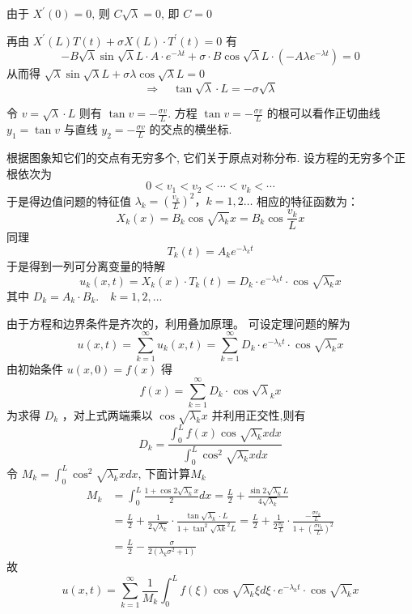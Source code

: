 \begin{questions}
\begin{solution}
由于 $ X^{\prime}(0)=0 \text {, 则 } C \sqrt{\lambda}=0 $, 即 $ C=0$

再由 $ X^{\prime}(L) T(t)+\sigma X(L) \cdot T^{\prime}(t)=0 $ 有
$$ -B \sqrt{\lambda} \sin \sqrt{\lambda} L \cdot A \cdot e^{-\lambda t}+\sigma \cdot B \cos \sqrt{\lambda} L \cdot\left(-A \lambda e^{-\lambda t}\right)=0 $$
从而得 $ \sqrt{\lambda} \sin \sqrt{\lambda} L+\sigma \lambda\cos \sqrt{\lambda} L=0 $
$$
\Rightarrow \quad \tan \sqrt{\lambda} \cdot L=-{\sigma}{\sqrt{\lambda}}
$$

令 $ v=\sqrt{\lambda} \cdot L $ 则有 $ \tan v=-\frac{\sigma v}{L} $. 
方程 $ \tan v=-\frac{\sigma v}{L} $ 的根可以看作正切曲线 $ y_{1}=\tan v $ 与直线 $ y_{2}=-\frac{\sigma v}{L} $ 的交点的横坐标. 

根据图象知它们的交点有无穷多个, 它们关于原点对称分布. 设方程的无穷多个正根依次为 
$$ 0<v_{1}<v_{2}<\cdots<v_{k}<\cdots $$
于是得边值问题的特征值 $ \lambda_{k}=\left(\frac{v_{k}}{L}\right)^{2} ， k=1,2 \ldots $ 相应的特征函数为： $$ X_{k}(x)=B_{k} \cos \sqrt{\lambda_{k}} x=B_{k} \cos \frac{v_{k}}{L} x $$
同理 $$ T_{k}(t)=A_{k} e^{-\lambda_{k} t} $$ 于是得到一列可分离变量的特解
$$
u_{k}(x, t)=X_{k}(x) \cdot T_{k}(t)=D_{k} \cdot e^{-\lambda_{k} t} \cdot \cos \sqrt{\lambda_{k}} x
$$
其中 $ D_{k}=A_{k} \cdot B_{k} .\quad k=1,2, \ldots $

由于方程和边界条件是齐次的，利用叠加原理。
可设定理问题的解为
$$
u(x, t)=\sum_{k=1}^{\infty} u_{k}(x, t)=\sum_{k=1}^{\infty} D_{k} \cdot e^{-\lambda_{k} t} \cdot \cos \sqrt{\lambda_{k}} x
$$
由初始条件 $ u(x, 0)=f(x) $
得 $$ f(x)=\sum_{k=1}^{\infty} D_{k} \cdot \cos \sqrt{\lambda}_{k} x $$
为求得 $ D_{k} $ ，对上式两端乘以 $ \cos \sqrt{\lambda_{k}} x $ 并利用正交性,则有
$$D_{k}  =\frac{\int_{0}^{L} f(x) \cos \sqrt{\lambda_{k}} x d x}{\int_{0}^{L} \cos ^{2} \sqrt{\lambda_{k}} x d x} $$
 令  $M_{k}  =\int_{0}^{L} \cos ^{2} \sqrt{\lambda_{k}} x d x$, 下面计算$M_{k}$
$$\begin{aligned}
 M_{k} & =\int_{0}^{L} \frac{1+\cos 2 \sqrt{\lambda_{k}} x}{2} d x  =\frac{L}{2}+\frac{\sin 2 \sqrt{\lambda_{k}} L}{4 \sqrt{\lambda_{k}}} \\
& =\frac{L}{2}+\frac{1}{2 \sqrt{\lambda_{k}}} \cdot \frac{\tan \sqrt{\lambda_{k}} \cdot L}{1+\tan ^{2} \sqrt{\lambda k}^{2} L}  =\frac{L}{2}+\frac{1}{2 \frac{v_{k}}{L}} \cdot \frac{-\frac{\sigma v_k}{L}}{1+\left(\frac{\sigma v_k}{L}\right)^{2}} \\
& =\frac{L}{2}-\frac{\sigma}{2\left(\lambda_{k}\sigma^{2}+1\right)}
\end{aligned}
$$
故 $$ u(x, t)=\sum_{k=1}^{\infty} \frac{1}{M_{k}} \int_{0}^{L} f(\xi) \cos \sqrt{\lambda_{k}} \xi d \xi \cdot e^{-\lambda_{k} t} \cdot \cos \sqrt{\lambda_{k}} x $$


\end{solution}
\end{questions}
